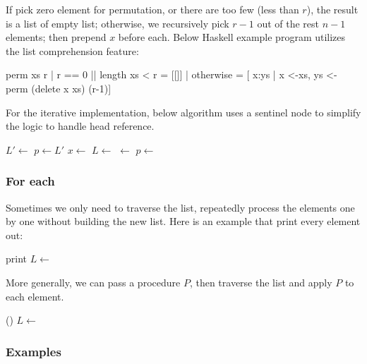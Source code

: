 \documentclass[b5paper]{article}
\begin{document}
If pick zero element for permutation, or there are too few (less than $r$), the result is a list of empty list; otherwise, we recursively pick $r-1$ out of the rest $n-1$ elements; then prepend $x$ before each. Below Haskell example program utilizes the list comprehension feature:

\begin{Haskell}
perm xs r | r == 0 || length xs < r = [[]]
          | otherwise = [ x:ys | x <-xs,
                                 ys <- perm (delete x xs) (r-1)]
\end{Haskell}

For the iterative implementation, below algorithm uses a sentinel node to simplify the logic to handle head reference.

\begin{algorithmic}[1]
  \State $L' \gets$  
  \State $p \gets L'$
    \State $x \gets$ 
    \State $L \gets$ 
    \State {} $\gets$ 
    \State $p \gets$ 
  \EndWhile
  \State \Return {} 
\EndFunction
\end{algorithmic}

\subsubsection{For each}

Sometimes we only need to traverse the list, repeatedly process the elements one by one without building the new list. Here is an example that print every element out:

\begin{algorithmic}[1]
    \State print 
    \State $L \gets$ 
  \EndWhile
\EndFunction
\end{algorithmic}

More generally, we can pass a procedure $P$, then traverse the list and apply $P$ to each element.

\begin{algorithmic}[1]
    \State {}()
    \State $L \gets$ 
  \EndWhile
\EndFunction
\end{algorithmic}

\subsubsection{Examples}
\end{document}
